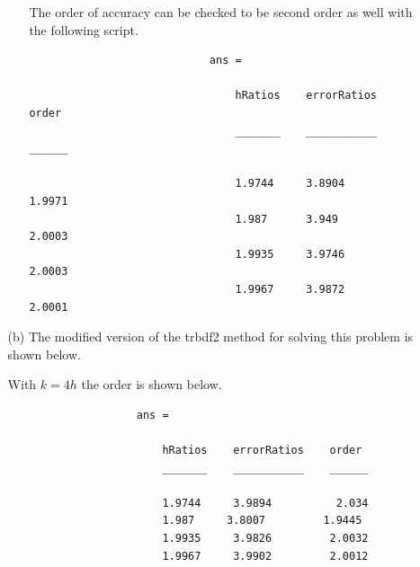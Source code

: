 \documentclass[11pt, oneside, titlepage]{article}
\begin{document}
\begin{enumerate}
\begin{enumerate}
\begin{enumerate}
                        The order of accuracy can be checked to be second order
                        as well with the following script.
                        
                        \begin{verbatim}
                            ans = 

                                hRatios    errorRatios    order 
                                _______    ___________    ______

                                1.9744     3.8904         1.9971
                                1.987      3.949         2.0003
                                1.9935     3.9746         2.0003
                                1.9967     3.9872         2.0001
                        \end{verbatim}
                \end{enumerate}

            \item[(b)] %
                The modified version of the trbdf2 method for solving this
                problem is shown below.
                
                With $k = 4h$ the order is shown below.
                
                \begin{verbatim}
                    ans = 

                        hRatios    errorRatios    order 
                        _______    ___________    ______

                        1.9744     3.9894          2.034
                        1.987     3.8007         1.9445
                        1.9935     3.9826         2.0032
                        1.9967     3.9902         2.0012
                \end{verbatim}


\end{enumerate}
\end{enumerate}
\end{document}
